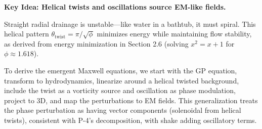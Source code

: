 \textbf{Key Idea: Helical twists and oscillations source EM-like fields.}

Straight radial drainage is unstable—like water in a bathtub, it must spiral. This helical pattern $\theta_{\text{twist}} = \pi/\sqrt{\phi}$ minimizes energy while maintaining flow stability, as derived from energy minimization in Section 2.6 (solving $x^2 = x + 1$ for $\phi \approx 1.618$).

To derive the emergent Maxwell equations, we start with the GP equation, transform to hydrodynamics, linearize around a helical twisted background, include the twist as a vorticity source and oscillation as phase modulation, project to 3D, and map the perturbations to EM fields. This generalization treats the phase perturbation as having vector components (solenoidal from helical twists), consistent with P-4's decomposition, with shake adding oscillatory terms.

